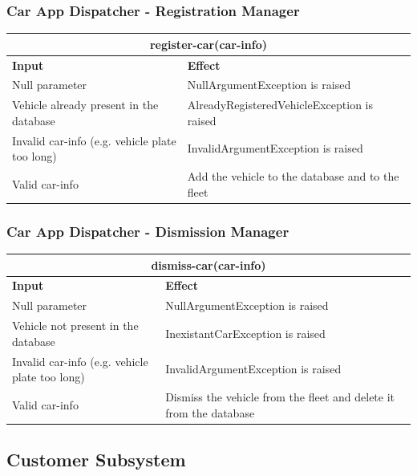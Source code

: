 \documentclass{article}
\begin{document}
\subsubsection{Car App Dispatcher - Registration Manager}
\begin{tabular}{ |p{5cm}|p{7cm}| }
  \hline
  \multicolumn{2}{|c|}{register-car(car-info)} \\
  \hline
  \textbf{Input} & \textbf{Effect} \\
  \hline
  Null parameter & NullArgumentException is raised\\
  \hline
  Vehicle already present in the database & AlreadyRegisteredVehicleException is raised\\
  \hline
  Invalid car-info (e.g. vehicle plate too long) & InvalidArgumentException is raised\\
  \hline
  Valid car-info & Add the vehicle to the database and to the fleet\\
  \hline
\end{tabular}
\subsubsection{Car App Dispatcher - Dismission Manager}
\begin{tabular}{ |p{5cm}|p{7cm}| }
  \hline
  \multicolumn{2}{|c|}{dismiss-car(car-info)} \\
  \hline
  \textbf{Input} & \textbf{Effect} \\
  \hline
  Null parameter & NullArgumentException is raised\\
  \hline
  Vehicle not present in the database & InexistantCarException is raised\\
  \hline
  Invalid car-info (e.g. vehicle plate too long) & InvalidArgumentException is raised\\
  \hline
  Valid car-info & Dismiss the vehicle from the fleet and delete it from the database\\
  \hline
\end{tabular}

\subsection{Customer Subsystem}






\end{document}
